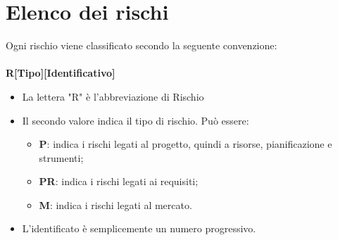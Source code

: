 \section{Elenco dei rischi}
Ogni rischio viene classificato secondo la seguente convenzione:\\\\
\centering \textbf{R[Tipo][Identificativo]}\\
\begin{itemize}
	\item La lettera "R" è l'abbreviazione di Rischio
	\item Il secondo valore indica il tipo di rischio. Può essere:
		\begin{itemize}
			\item \textbf{P}: indica i rischi legati al progetto, quindi a risorse, pianificazione e strumenti;
			\item \textbf{PR}: indica i rischi legati ai requisiti;
			\item \textbf{M}: indica i rischi legati al mercato.
		\end{itemize}
	\item L'identificato è semplicemente un numero progressivo.
\end{itemize}
